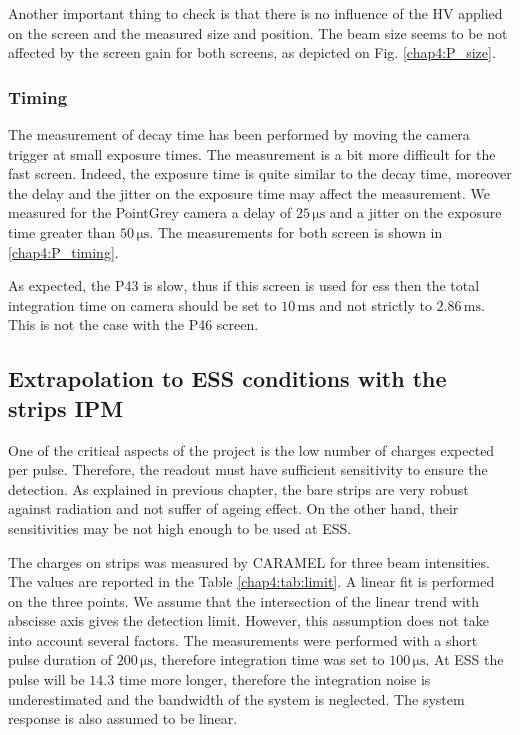 \begin{refsection}
  Another important thing to check is that there is no influence of the HV applied on the screen and the measured size and position. The beam size seems to be not affected by the screen gain for both screens, as depicted on Fig. \ref{chap4:P_size}.

  

  \subsubsection{Timing}
  The measurement of decay time has been performed by moving the camera trigger at small exposure times. The measurement is a bit more difficult for the fast screen. Indeed, the exposure time is quite similar to the decay time, moreover the delay and the jitter on the exposure time may affect the measurement.
  We measured for the PointGrey camera a delay of $25\,\mathrm{\mu s}$ and a jitter on the exposure time greater than $50\,\mathrm{\mu s}$. The measurements for both screen is shown in \ref{chap4:P_timing}.

  

  As expected, the P43 is slow, thus if this screen is used for \acrshort{ess} then the total integration time on camera should be set to $10\,\mathrm{ms}$ and not strictly to $2.86\,\mathrm{ms}$. This is not the case with the P46 screen.

  \subsection{Extrapolation to ESS conditions with the strips IPM}

  One of the critical aspects of the project is the low number of charges expected per pulse. Therefore, the  readout must have sufficient sensitivity to ensure the detection. As explained in previous chapter, the bare strips are very robust against radiation and not suffer of ageing effect. On the other hand, their sensitivities may be not high enough to be used at ESS.

  

  The charges on strips was measured by CARAMEL for three beam intensities. The values are reported in the Table \ref{chap4:tab:limit}. A linear fit is performed on the three points. We assume that the intersection of the linear trend with abscisse axis gives the detection limit. However, this assumption does not take into account several factors. The measurements were performed with a short pulse duration of $200\,\mathrm{\mu s}$, therefore integration time was set to $100\,\mathrm{\mu s}$. At ESS the pulse will be $14.3$ time more longer, therefore the integration noise is underestimated and the bandwidth of the system is neglected. The system response is also assumed to be linear.


\end{refsection}
